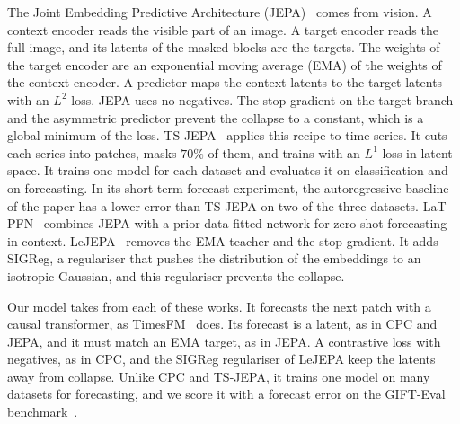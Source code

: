 The Joint Embedding Predictive Architecture
(JEPA)~\citep{assran2023ijepa} comes from vision. A context encoder
reads the visible part of an image. A target encoder reads the full
image, and its latents of the masked blocks are the targets. The
weights of the target encoder are an exponential moving average (EMA)
of the weights of the context encoder. A predictor maps the context
latents to the target latents with an $L^2$ loss. JEPA uses no
negatives. The stop-gradient on the target branch and the asymmetric
predictor prevent the collapse to a constant, which is a global
minimum of the loss. TS-JEPA~\citep{ennadir2025tsjepa} applies this
recipe to time series. It cuts each series into patches, masks
$70\%$ of them, and trains with an $L^1$ loss in latent space. It
trains one model for each dataset and evaluates it on classification
and on forecasting. In its short-term forecast experiment, the
autoregressive baseline of the paper has a lower error than TS-JEPA on
two of the three datasets.
LaT-PFN~\citep{verdenius2024latpfn} combines JEPA with a prior-data
fitted network for zero-shot forecasting in context.
LeJEPA~\citep{balestriero2025lejepa} removes the EMA teacher and the
stop-gradient. It adds SIGReg, a regulariser that pushes the
distribution of the embeddings to an isotropic Gaussian, and this
regulariser prevents the collapse.


Our model takes from each of these works. It forecasts the next patch
with a causal transformer, as TimesFM~\citep{das2024timesfm} does. Its
forecast is a latent, as in CPC and JEPA, and it must match an EMA
target, as in JEPA. A contrastive loss with negatives, as in CPC, and
the SIGReg regulariser of LeJEPA keep the latents away from collapse.
Unlike CPC and TS-JEPA, it trains one model on many datasets for
forecasting, and we score it with a forecast error on the GIFT-Eval
benchmark~\citep{aksu2024gifteval}.
